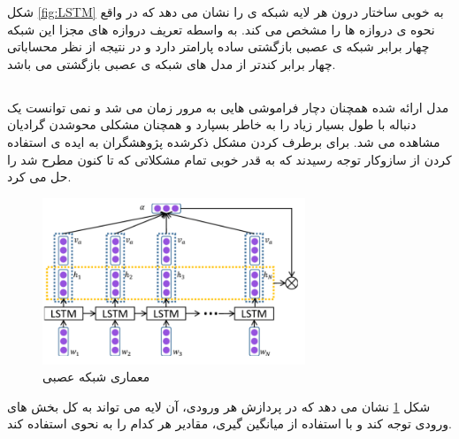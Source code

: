 شکل  \ref{fig:LSTM} به خوبی ساختار درون هر لایه شبکه ی  را نشان می دهد که در واقع نحوه ی دروازه ها را مشخص
می کند. به واسطه تعریف دروازه های مجزا این شبکه چهار برابر شبکه ی عصبی بازگشتی ساده پارامتر دارد و در نتیجه از
نظر محساباتی چهار برابر کندتر از مدل های شبکه ی عصبی بازگشتی می باشد.

\subsection{}
مدل  ارائه شده همچنان دچار فراموشی هایی به مرور زمان می شد و نمی توانست یک دنباله با طول بسیار زیاد را
به خاطر بسپارد و همچنان مشکلی محوشدن گرادیان مشاهده می شد. برای برطرف کردن مشکل ذکرشده پژوهشگران به ایده ی استفاده کردن از سازوکار توجه رسیدند که به قدر خوبی تمام مشکلاتی که تا کنون مطرح شد را حل می کرد.
\begin{figure}[H]
	\centering
	\includegraphics[width=0.7\textwidth]{figures/Attention.png}
	\caption{معماری شبکه عصبی }
	\label{fig:Attention}
\end{figure}
شکل  \ref{fig:Attention} نشان می دهد که در پردازش هر ورودی، آن لایه می تواند به کل بخش های ورودی توجه کند و با استفاده
از میانگین گیری، مقادیر هر کدام را به نحوی استفاده کند.

